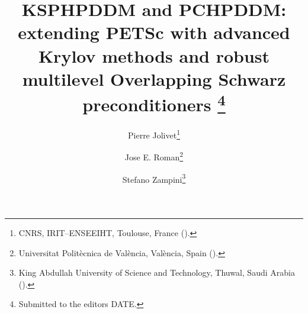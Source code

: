

\usepackage{lipsum}
\usepackage{amsfonts}
\usepackage{graphicx}
\usepackage{epstopdf}
\usepackage{algorithmic}
\ifpdf
\else
\fi

\newcommand{\creflastconjunction}{, and~}



\title{KSPHPDDM and PCHPDDM: extending PETS\MakeLowercase{c} with advanced Krylov methods and robust multilevel Overlapping Schwarz preconditioners
\thanks{Submitted to the editors DATE.
}}

\author{Pierre Jolivet\thanks{CNRS, IRIT--ENSEEIHT, Toulouse, France 
  ().}
\and Jose E. Roman\thanks{Universitat Polit\`ecnica de Val\`encia, Val\`encia, Spain
  ().}
\and Stefano Zampini\thanks{King Abdullah University of Science and Technology, Thuwal, Saudi Arabia 
  ().}}

\usepackage{amsopn}
\DeclareMathOperator{\diag}{diag}


